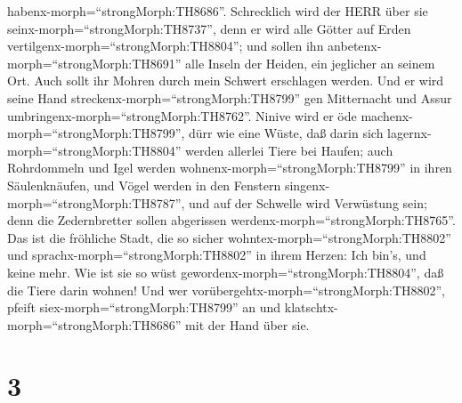 habenx-morph=``strongMorph:TH8686''.  Schrecklich wird der
HERR über sie seinx-morph=``strongMorph:TH8737'', denn er wird alle
Götter auf Erden vertilgenx-morph=``strongMorph:TH8804''; und sollen ihn
anbetenx-morph=``strongMorph:TH8691'' alle Inseln der Heiden, ein
jeglicher an seinem Ort.  Auch sollt ihr Mohren durch mein
Schwert erschlagen werden.  Und er wird seine Hand
streckenx-morph=``strongMorph:TH8799'' gen Mitternacht und Assur
umbringenx-morph=``strongMorph:TH8762''. Ninive wird er öde
machenx-morph=``strongMorph:TH8799'', dürr wie eine Wüste, 
daß darin sich lagernx-morph=``strongMorph:TH8804'' werden allerlei
Tiere bei Haufen; auch Rohrdommeln und Igel werden
wohnenx-morph=``strongMorph:TH8799'' in ihren Säulenknäufen, und Vögel
werden in den Fenstern singenx-morph=``strongMorph:TH8787'', und auf der
Schwelle wird Verwüstung sein; denn die Zedernbretter sollen abgerissen
werdenx-morph=``strongMorph:TH8765''.  Das ist die
fröhliche Stadt, die so sicher wohntex-morph=``strongMorph:TH8802'' und
sprachx-morph=``strongMorph:TH8802'' in ihrem Herzen: Ich bin's, und
keine mehr. Wie ist sie so wüst gewordenx-morph=``strongMorph:TH8804'',
daß die Tiere darin wohnen! Und wer
vorübergehtx-morph=``strongMorph:TH8802'', pfeift
siex-morph=``strongMorph:TH8799'' an und
klatschtx-morph=``strongMorph:TH8686'' mit der Hand über sie.

\hypertarget{section-2}{%
\section{3}\label{section-2}}


